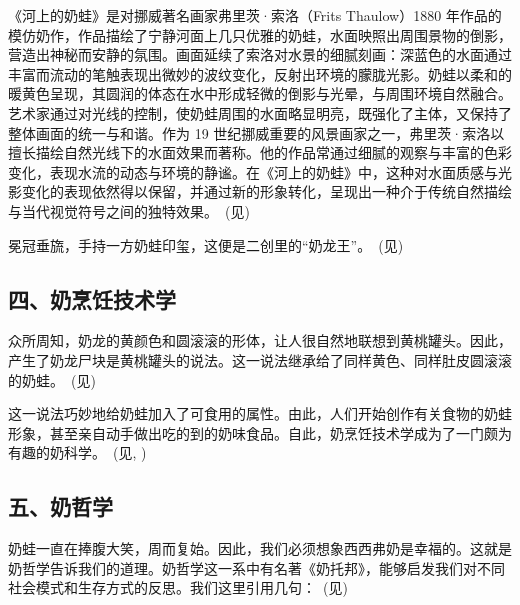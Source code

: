 

《河上的奶蛙》是对挪威著名画家弗里茨·索洛（Frits Thaulow）1880 年作品的模仿奶作，作品描绘了宁静河面上几只优雅的奶蛙，水面映照出周围景物的倒影，营造出神秘而安静的氛围。画面延续了索洛对水景的细腻刻画：深蓝色的水面通过丰富而流动的笔触表现出微妙的波纹变化，反射出环境的朦胧光影。奶蛙以柔和的暖黄色呈现，其圆润的体态在水中形成轻微的倒影与光晕，与周围环境自然融合。艺术家通过对光线的控制，使奶蛙周围的水面略显明亮，既强化了主体，又保持了整体画面的统一与和谐。作为 19 世纪挪威重要的风景画家之一，弗里茨·索洛以擅长描绘自然光线下的水面效果而著称。他的作品常通过细腻的观察与丰富的色彩变化，表现水流的动态与环境的静谧。在《河上的奶蛙》中，这种对水面质感与光影变化的表现依然得以保留，并通过新的形象转化，呈现出一种介于传统自然描绘与当代视觉符号之间的独特效果。~(见)



\clearpage


冕冠垂旒，手持一方奶蛙印玺，这便是二创里的“奶龙王”。~(见)



\clearpage
\subsection{四、奶烹饪技术学}

众所周知，奶龙的黄颜色和圆滚滚的形体，让人很自然地联想到黄桃罐头。因此，产生了奶龙尸块是黄桃罐头的说法。这一说法继承给了同样黄色、同样肚皮圆滚滚的奶蛙。~(见)



这一说法巧妙地给奶蛙加入了可食用的属性。由此，人们开始创作有关食物的奶蛙形象，甚至亲自动手做出吃的到的奶味食品。自此，奶烹饪技术学成为了一门颇为有趣的奶科学。~(见, )





\clearpage
\subsection{五、奶哲学}

奶蛙一直在捧腹大笑，周而复始。因此，我们必须想象西西弗奶是幸福的。这就是奶哲学告诉我们的道理。奶哲学这一系中有名著《奶托邦》，能够启发我们对不同社会模式和生存方式的反思。我们这里引用几句：~(见)

